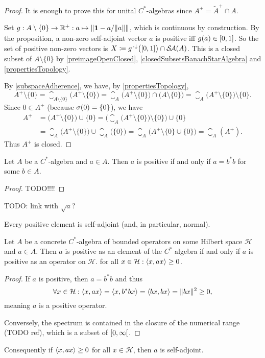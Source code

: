 \begin{proof}
It is enough to prove this for unital $C^*$-algebras since $A^+ = \widetilde{A}^+ \cap A$.

Set $g: A\setminus\{0\}\to \mathbb{R}^+: a\mapsto \lVert\boldsymbol{\mathrm{1}} - a/\lVert a\rVert\big.\rVert$, which is continuous by construction. By the proposition, a non-zero self-adjoint vector $a$ is positive iff $g(a) \in \interval{0,1}$. So the set of positive non-zero vectors is $X \defeq g^\preimf\big(\interval{0,1}\big) \cap \SelfAdjoints(A)$. This is a closed subset of $A\setminus\{0\}$ by \ref{preimageOpenClosed}, \ref{closedSubsetsBanachStarAlgebra} and \ref{propertiesTopology}.

By \ref{subspaceAdherence}, we have, by \ref{propertiesTopology},
\[ A^+\setminus\{0\} = \closure_{A\setminus\{0\}}\big(A^+\setminus\{0\}\big) = \closure_{A}\big(A^+\setminus\{0\}\big)\cap \big(A\setminus\{0\}\big) = \closure_{A}\big(A^+\setminus\{0\}\big)\setminus \{0\}. \]
Since $0\in A^+$ (because $\sigma(0) = \{0\}$), we have
\begin{align*}
A^+ &= \big(A^+ \setminus \{0\}\big) \cup \{0\} = \Big(\closure_{A}\big(A^+\setminus\{0\}\big)\setminus \{0\}\Big) \cup \{0\} \\
&= \closure_{A}\big(A^+\setminus\{0\}\big) \cup \closure_A\big(\{0\}\big) = \closure_{A}\big(A^+\setminus\{0\} \cup \{0\}\big) = \closure_A(A^+).
\end{align*}
Thus $A^+$ is closed.
\end{proof}

\begin{proposition}\label{existenceSquareRoot}
Let $A$ be a $C^*$-algebra and $a\in A$. Then $a$ is positive \textup{if and only if} $a = b^*b$ for some $b\in A$.
\end{proposition}
\begin{proof}
TODO!!!!
\end{proof}
TODO: link with $\sqrt{a}$?
\begin{corollary}
Every positive element is self-adjoint (and, in particular, normal).
\end{corollary}
\begin{corollary}
Let $A$ be a concrete $C^*$-algebra of bounded operators on some Hilbert space $\mathcal{H}$ and $a\in A$. Then $a$ is positive as an element of the $C^*$ algebra \textup{if and only if} $a$ is positive as an operator on $\mathcal{H}$. for all $x\in \mathcal{H}: \left\langle x,ax \right\rangle\geq 0$.
\end{corollary}
\begin{proof}
If $a$ is positive, then $a = b^*b$ and thus
\[ \forall x\in \mathcal{H}: \left\langle x,ax \right\rangle = \left\langle x, b^*bx \right\rangle = \left\langle bx,bx \right\rangle = \lVert bx\rVert^2 \geq 0, \]
meaning $a$ is a positive operator.

Conversely, the spectrum is contained in the closure of the numerical range (TODO ref), which is a subset of $\interval[co]{0,\infty}$.
\end{proof}
Consequently if $\left\langle x,ax \right\rangle\geq 0$ for all $x\in\mathcal{H}$, then $a$ is self-adjoint.

